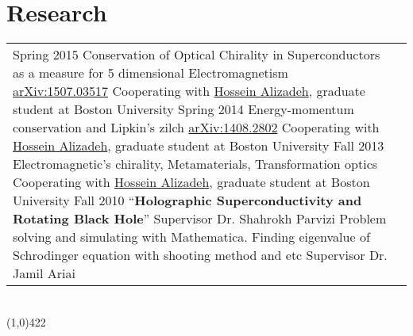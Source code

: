 \documentclass[10pt]{article}
\newcommand\HRule{\hspace*{.8cm}\line(1,0){422}\\}
\newenvironment{Record}[1]
{
    \vspace{-0.5cm}
    \section*{#1}
        \vspace{0.1cm}
        \begin{tabular}
}
{
        \end{tabular}\\
        \HRule
}
\begin{document}
\begin{Record}{Research}{l p{11cm}}
    \Research{Publication}
        {Spring 2015}
        {Conservation of Optical Chirality in Superconductors as a measure for 5 dimensional Electromagnetism \href{http://arxiv.org/abs/1507.03517}{arXiv:1507.03517}}
        {Cooperating with}
        {\href{http://physics.bu.edu/people/show/halizade}{Hossein Alizadeh}, graduate student at Boston University}
        {}{}%
    \Research{Publication}
        {Spring 2014}
        {Energy-momentum conservation and Lipkin’s zilch \href{http://arxiv.org/abs/1408.2802}{arXiv:1408.2802}}
        {Cooperating with}
        {\href{http://physics.bu.edu/people/show/halizade}{Hossein Alizadeh}, graduate student at Boston University}
        {}{}%
    \Research{Independent Research}
        {Fall 2013}
        {Electromagnetic's chirality, Metamaterials, Transformation optics}
        {Cooperating with}
        {\href{http://physics.bu.edu/people/show/halizade}{Hossein Alizadeh}, graduate student at Boston University}
        {}{}%
    \Research{M.Sc thesis}
        {Fall 2010}
        {``\textbf{Holographic Superconductivity and Rotating Black Hole}''}
        {Supervisor}
        {Dr. Shahrokh Parvizi}
        {}{}%
    \Research{B.Sc projects}
        {}
        {Problem solving and simulating with Mathematica.}
        {}
        {Finding eigenvalue of Schrodinger equation with shooting method and etc}
        {Supervisor}
        {Dr. Jamil Ariai}%

\end{Record}


\newcommand{\Reference}[5]{
    \multicolumn{2}{l}{\copperplatefont{\textbf{\textsl{ #1}}}}\\
    \quad#2&\scriptsize\textit{#3}\\
    &\scriptsize\textit{#4}\\
    &\scriptsize\textit{#5}\\
}
\end{document}
